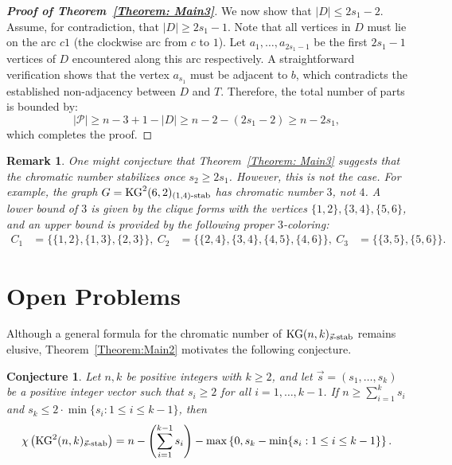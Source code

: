 \documentclass[preprint,12pt,3p]{elsarticle}
\newtheorem{remark}[theorem]{Remark}
\newtheorem{conjecture}[theorem]{Conjecture}
\begin{document}
\begin{proof}[\textbf{Proof of Theorem~\ref{Theorem: Main3}}]
We now show that $|D| \leq 2s_1-2$. Assume, for contradiction, that $|D| \geq 2s_1-1$. Note that all vertices in $D$ must lie on the arc $c1$ (the clockwise arc from $c$ to $1$). Let $a_1, \ldots, a_{2s_1-1}$ be the first $2s_1-1$ vertices of $D$ encountered along this arc respectively. A straightforward verification shows that the vertex $a_{s_1}$ must be adjacent to $b$, which contradicts the established non-adjacency between $D$ and $T$.
 Therefore, the total number of parts is bounded by:
\[
|\mathcal{P}|\geq n-3+1-|D|\geq n-2-(2s_1-2)\geq n-2s_1,
\]
which completes the proof.

\end{proof}


\begin{remark}
One might conjecture that Theorem~\ref{Theorem: Main3} suggests that the chromatic number stabilizes once $s_2 \geq 2s_1$. However, this is not the case. For example, the graph $G = \mathrm{KG}^{2}(6, 2)_{(1,4)\textup{-stab}}$ has chromatic number $3$, not $4$. A lower bound of $3$ is given by the clique forms with the vertices $\{1,2\}, \{3,4\}, \{5,6\}$, and an upper bound is provided by the following proper $3$-coloring:
\begin{align*}
C_1 &= \{\{1,2\}, \{1,3\}, \{2,3\}\}, \
C_2 &= \{\{2,4\}, \{3,4\}, \{4,5\}, \{4,6\}\}, \
C_3 &= \{\{3,5\}, \{5,6\}\}.
\end{align*}
\end{remark}





\section{Open Problems}

Although a general formula for the chromatic number of $\mathrm{KG}(n,k)_{\vec{s}\textup{-stab}}$ remains elusive, Theorem~\ref{Theorem:Main2} motivates the following conjecture.

\begin{conjecture}\label{conj5}
Let $n, k$ be positive integers with $k \geq 2$, and let $\vec{s} = (s_1, \ldots, s_k)$ be a positive integer vector such that $s_i \geq 2$ for all $i = 1, \ldots, k-1$. If $n \geq \sum_{i=1}^{k} s_i$ and $s_k \leq 2 \cdot \min\{s_i : 1 \leq i \leq k-1\}$, then
\[
\chi\left(\mathrm{KG}^{2}(n, k)_{\vec{s}\textup{-stab}}\right) = n - \left(\sum_{i=1}^{k-1} s_i\right) - \max\left\{0, s_k - \min\{s_i : 1 \leq i \leq k-1\}\right\}.
\]
\end{conjecture}
\end{document}
